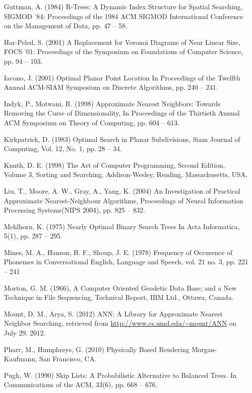 \documentclass[mcs]{scsthesis}
\begin{document}
\begin{thebibliography}{5}
Guttman, A. (1984) R-Trees: A Dynamic Index Structure for Spatial Searching,
SIGMOD '84: Proceedings of the 1984 ACM SIGMOD International Conference on the
Management of Data, pp. 47 -- 58.

Har-Peled, S. (2001) A Replacement for Voronoi Diagrams of Near Linear Size, 
FOCS '01: Proceedings of the Symposium on Foundations of Computer Science, 
pp. 94 -- 103.

Iacono, J. (2001) Optimal Planar Point Location
In Proceedings of the Twelfth Annual ACM-SIAM Symposium on Discrete Algorithms,
pp. 240 -- 241.

Indyk, P., Motwani, R. (1998) Approximate Nearest Neighbors: Towards Removing
the Curse of Dimensionality, In Proceedings of the Thirtieth Annual ACM
Symposium on Theory of Computing, pp. 604 -- 613.

Kirkpatrick, D. (1983) Optimal Search in Planar Subdivisions,
Siam Journal of Computing, Vol. 12, No. 1, pp. 28 -- 34.

Knuth, D. E. (1998) The Art of Computer Programming, Second Edition,
Volume 3, Sorting and Searching. Addison-Wesley, Reading, Massachusetts, USA.

Liu, T., Moore, A. W., Gray, A., Yang, K. (2004) An Investigation of Practical
Approximate Nearest-Neighbour Algorithms, Proceedings of Neural Information
Processing Systems(NIPS 2004), pp. 825 -- 832.

Mehlhorn, K. (1975) Nearly Optimal Binary Search Trees 
In Acta Informatica, 5(1), pp. 287 -- 295.

Mines, M. A., Hanson, B. F., Shoup, J. E. (1978) Frequency of Occurence of
Phonemes in Conversational English, Language and Speech, vol. 21 no. 3,
pp. 221 -- 241 

Morton, G. M. (1966), A Computer Oriented Geodetic Data Base; and a New
Technique in File Sequencing, Technical Report, IBM Ltd., Ottawa, Canada.

Mount, D. M., Arya, S. (2012) ANN: A Library for Approximate Nearest Neighbor
Searching, retrieved from \url{http://www.cs.umd.edu/~mount/ANN} on July 29, 2012.

Pharr, M., Humphreys, G. (2010) Physically Based Rendering
Morgan-Kaufmann, San Francisco, CA.

Pugh, W. (1990) Skip Lists: A Probabilistic Alternative to Balanced Trees.
In Communications of the ACM, 33(6), pp. 668 -- 676.


\end{thebibliography}
\end{document}
